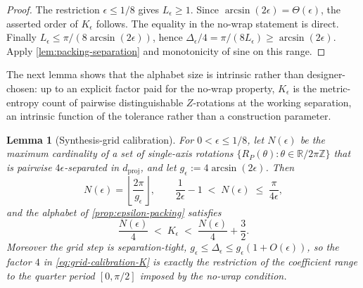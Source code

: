 \documentclass[a4paper,twocolumn,10pt,unpublished]{quantumarticle}
\newtheorem{lemma}{Lemma}
\begin{document}
\begin{proof}
The restriction $\epsilon\leq1/8$ gives $L_\epsilon\geq1$.
Since $\arcsin(2\epsilon)=\Theta(\epsilon)$, the asserted order of
$K_\epsilon$ follows.  The equality in the no-wrap statement is direct.
Finally $L_\epsilon\leq\pi/(8\arcsin(2\epsilon))$, hence
$\Delta_\epsilon/4=\pi/(8L_\epsilon)\geq\arcsin(2\epsilon)$.
Apply \cref{lem:packing-separation} and monotonicity of sine on this range.
\end{proof}

The next lemma shows that the alphabet size is intrinsic rather than
designer-chosen: up to
an explicit factor paid for the no-wrap property, $K_\epsilon$ is the
metric-entropy count of pairwise distinguishable $Z$-rotations at the
working separation, an intrinsic function of the tolerance rather than a
construction parameter.

\begin{lemma}[Synthesis-grid calibration]
\label{lem:grid-calibration}
For $0<\epsilon\leq1/8$, let $N(\epsilon)$ be the maximum cardinality of
a set of single-axis rotations $\{R_P(\theta):\theta\in\mathbb
R/2\pi\mathbb Z\}$ that is pairwise $4\epsilon$-separated in
$d_{\mathrm{proj}}$, and let $g_\epsilon:=4\arcsin(2\epsilon)$.  Then
\begin{equation}\label{eq:grid-calibration}
 N(\epsilon)=\left\lfloor\frac{2\pi}{g_\epsilon}\right\rfloor,
 \qquad
 \frac{1}{2\epsilon}-1\;<\;N(\epsilon)\;\leq\;\frac{\pi}{4\epsilon},
\end{equation}
and the alphabet of \cref{prop:epsilon-packing} satisfies
\begin{equation}\label{eq:grid-calibration-K}
 \frac{N(\epsilon)}{4}\;<\;K_\epsilon\;<\;\frac{N(\epsilon)}{4}+\frac32 .
\end{equation}
Moreover the grid step is separation-tight,
$g_\epsilon\leq\Delta_\epsilon\leq g_\epsilon(1+O(\epsilon))$, so the
factor $4$ in \eqref{eq:grid-calibration-K} is exactly the restriction of
the coefficient range to the quarter period $[0,\pi/2]$ imposed by the
no-wrap condition.
\end{lemma}
\end{document}
